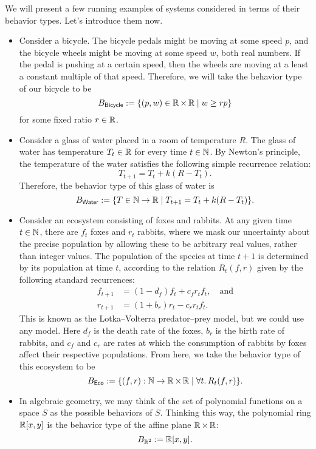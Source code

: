 \begin{ex}
We will present a few running examples of systems considered in terms of their behavior types. Let's introduce them now.

\begin{itemize}
    \item Consider a bicycle. The bicycle pedals might be moving at some speed $p$, and the bicycle wheels might be moving at some speed $w$, both real numbers. If the pedal is pushing at a certain speed, then the wheels are moving at a least a constant multiple of that speed. Therefore, we will take the behavior type of our bicycle to be
    $$B_{\mathsf{{Bicycle}}} := \{(p, w) \in \operatorname{\mathbb{R}} \times \operatorname{\mathbb{R}} \mid w \geq rp \}$$
    for some fixed ratio $r \in \operatorname{\mathbb{R}}$.
    
    \item Consider a glass of water placed in a room of temperature $R$. The glass of water has temperature $T_t \in \operatorname{\mathbb{R}}$ for every time $t \in \operatorname{\mathbb{N}}$. By Newton's principle, the temperature of the water satisfies the following simple recurrence relation:
    $$T_{t + 1} = T_t + k(R - T_t).$$
    Therefore, the behavior type of this glass of water is
    $$B_{\mathsf{{Water}}} := \{ T \in \operatorname{\mathbb{N}} \to \operatorname{\mathbb{R}} \mid T_{t + 1} = T_t + k(R - T_t)\}.$$
    
    \item Consider an ecosystem consisting of foxes and rabbits. At any given time $t \in \operatorname{\mathbb{N}}$, there are $f_t$ foxes and $r_t$ rabbits, where we mask our uncertainty about the precise population by allowing these to be arbitrary real values, rather than integer values. The population of the species at time $t + 1$ is determined by its population at time $t$, according to the relation  $R_t(f, r)$ given by the following standard recurrences:
    \begin{align*}
        f_{t + 1} &= (1 - d_f)f_t + c_f r_t f_t, \quad\text{and} \\
        r_{t + 1} &= (1 + b_r)r_t - c_r r_t f_t.
    \end{align*}
    This is known as the Lotka--Volterra predator--prey model, but we could use any model. Here $d_f$ is the death rate of the foxes, $b_r$ is the birth rate of rabbits, and $c_f$ and $c_r$ are rates at which the consumption of rabbits by foxes affect their respective populations.   From here, we take the behavior type of this ecosystem to be
    $$B_{\mathsf{{Eco}}} := \{(f, r) : \operatorname{\mathbb{N}} \to \operatorname{\mathbb{R}} \times \operatorname{\mathbb{R}} \mid \forall t.\, R_t(f, r)\}.$$
    
    \item In algebraic geometry, we may think of the set of polynomial functions on a space $S$ as the possible behaviors of $S$. Thinking this way, the polynomial ring $\operatorname{\mathbb{R}}[x, y]$ is the behavior type of the affine plane $\operatorname{\mathbb{R}} \times \operatorname{\mathbb{R}}$:
    $$B_{\operatorname{\mathbb{R}}^2} := \operatorname{\mathbb{R}}[x, y].$$
\end{itemize}
\end{ex}

